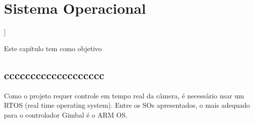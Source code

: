 \chapter{Sistema Operacional}]

\label{CAP5}


Este capítulo tem como objetivo 


\section{ccccccccccccccccccc}\label{Sub:equa}

Como o projeto requer controle em tempo real da câmera, é necessário usar um RTOS (real time operating system).
Entre os SOs apresentados, o mais adequado para o controlador Gimbal é o ARM OS.

